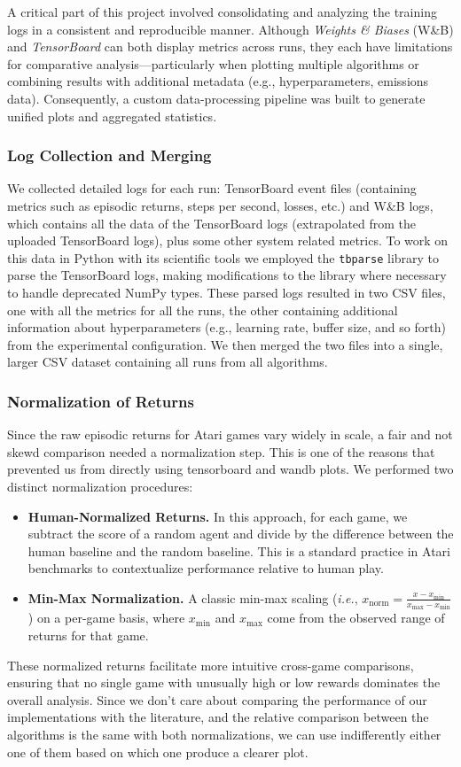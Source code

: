 A critical part of this project involved consolidating and analyzing the training logs in a consistent and reproducible manner. Although \textit{Weights \& Biases} (W\&B) and \textit{TensorBoard} can both display metrics across runs, they each have limitations for comparative analysis—particularly when plotting multiple algorithms or combining results with additional metadata (e.g., hyperparameters, emissions data). Consequently, a custom data-processing pipeline was built to generate unified plots and aggregated statistics.

\subsubsection{Log Collection and Merging}
We collected detailed logs for each run: TensorBoard event files (containing metrics such as episodic returns, steps per second, losses, etc.) and W\&B logs, which contains all the data of the TensorBoard logs (extrapolated from the uploaded TensorBoard logs), plus some other system related metrics. To work on this data in Python with its scientific tools we employed the \texttt{tbparse} library to parse the TensorBoard logs, making modifications to the library where necessary to handle deprecated NumPy types. These parsed logs resulted in two CSV files, one with all the metrics for all the runs, the other containing additional information about hyperparameters (e.g., learning rate, buffer size, and so forth) from the experimental configuration. We then merged the two files into a single, larger CSV dataset containing all runs from all algorithms.

\subsubsection{Normalization of Returns}
Since the raw episodic returns for Atari games vary widely in scale, a fair and not skewd comparison needed a normalization step. This is one of the reasons that prevented us from directly using tensorboard and wandb plots. We performed two distinct normalization procedures:
\begin{itemize}
	\item \textbf{Human-Normalized Returns.} In this approach, for each game, we subtract the score of a random agent and divide by the difference between the human baseline and the random baseline. This is a standard practice in Atari benchmarks to contextualize performance relative to human play.
	\item \textbf{Min-Max Normalization.} A classic min-max scaling (\emph{i.e.}, $x_{\text{norm}} = \frac{x - x_{\min}}{x_{\max} - x_{\min}}$) on a per-game basis, where $x_{\min}$ and $x_{\max}$ come from the observed range of returns for that game.
\end{itemize}
These normalized returns facilitate more intuitive cross-game comparisons, ensuring that no single game with unusually high or low rewards dominates the overall analysis. Since we don't care about comparing the performance of our implementations with the literature, and the relative comparison between the algorithms is the same with both normalizations, we can use indifferently either one of them based on which one produce a clearer plot.

